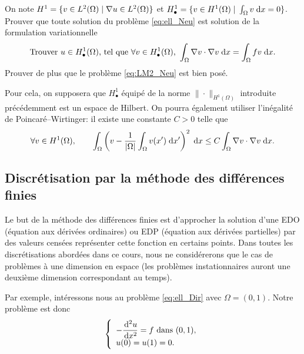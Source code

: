 \documentclass[12pt,a4paper,twoside]{article}
\begin{document}
\begin{exercise}
  On note $H^1 = \{ v \in L^2(\Omega) \; | \; \nabla u \in L^2(\Omega) \}$
  et $H_{\bullet}^1 = \{ v \in H^1(\Omega) \; | \; \int_{\Omega} v \;\mathrm{d} x = 0 \}$.
  Prouver que toute solution du probl\`eme \eqref{eq:ell_Neu}
  est solution de la formulation variationnelle
  \begin{align}
    \label{eq:LM2_Neu}
    \text{Trouver $u \in H_{\bullet}^1(\Omega)$, tel que $\forall v \in H_{\bullet}^1(\Omega)$, } 
    \int_{\Omega} \nabla v \cdot \nabla v \;\mathrm{d} x = \int_{\Omega} f v \;\mathrm{d} x .
  \end{align}
  Prouver de plus que le probl\`eme \eqref{eq:LM2_Neu} est bien pos\'e.

  Pour cela, on supposera que $H_{\bullet}^1$ \'equip\'e de la norme $\| \cdot \|_{H^1(\Omega)}$
  introduite pr\'ec\'edemment est un espace de Hilbert.
  On pourra \'egalement utiliser l'in\'egalit\'e de Poincar\'e--Wirtinger:
  il existe une constante $C>0$ telle que
  \begin{equation*}
    \forall v \in H^1(\Omega) , \qquad
    \int_{\Omega} \left( v - \dfrac{1}{|\Omega|} \int_{\Omega} v(x') \;\mathrm{d} x' \right)^2
    \;\mathrm{d} x \leq C \int_{\Omega} \nabla v \cdot \nabla v \;\mathrm{d} x .
  \end{equation*}
\end{exercise}
\subsection{Discr\'etisation par la m\'ethode des diff\'erences finies}
\label{subsec:ell_DF}

Le but de la m\'ethode des diff\'erences finies est d'approcher la solution 
d'une EDO (\'equation aux d\'eriv\'ees ordinaires) ou EDP
(\'equation aux d\'eriv\'ees partielles) par des valeurs cens\'ees repr\'esenter
cette fonction en certains points. Dans toutes les discr\'etisations abord\'ees dans ce cours,
nous ne consid\'ererons que le cas de probl\`emes \`a une dimension en espace
(les probl\`emes instationnaires auront une deuxi\`eme dimension correspondant au temps).

Par exemple, int\'eressons nous au probl\`eme \eqref{eq:ell_Dir} avec $\Omega = (0,1)$.
Notre probl\`eme est donc
\begin{equation}
  \label{eq:ell_1d}
  \left\{
    \begin{array}{l}
      - \dfrac{\!\;\mathrm{d}^2 u}{\!\;\mathrm{d} x^2} = f \text{ dans } (0,1) ,
      \\
      u(0) = u(1) = 0 .
    \end{array}
  \right.
\end{equation}
\end{document}
